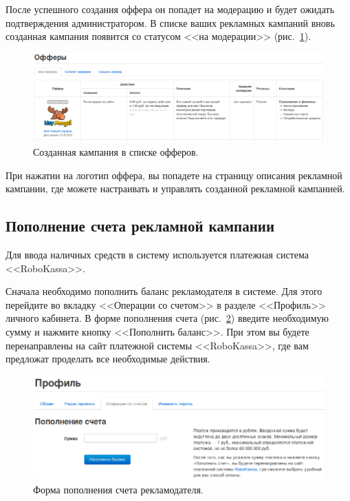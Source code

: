 \documentclass[a4paper,12pt]{article}
\begin{document}
После успешного создания оффера он попадет на модерацию и будет ожидать подтверждения администратором. В списке ваших рекламных кампаний вновь созданная кампания появится со статусом <<на модерации>> (рис.~\ref{fig:offer}).

\begin{figure}[!ht]
\centering
\includegraphics[width=\textwidth]{include/offer.png}
\caption{Созданная кампания в списке офферов.}
\label{fig:offer}
\end{figure}

При нажатии на логотип оффера, вы попадете на страницу описания рекламной кампании, где можете настраивать и управлять созданной рекламной кампанией.

\subsection{Пополнение счета рекламной кампании}

Для ввода наличных средств в систему \heymoose{} используется платежная система <<RoboKassa>>.

Сначала необходимо пополнить баланс рекламодателя в системе. Для этого перейдите во вкладку <<Операции со счетом>> в разделе <<Профиль>> личного кабинета. В форме пополнения счета (рис.~\ref{fig:operations}) введите необходимую сумму и нажмите кнопку <<Пополнить баланс>>. При этом вы будете перенаправлены на сайт платежной системы <<RoboKassa>>, где вам предложат проделать все необходимые действия.

\begin{figure}[!ht]
\centering
\includegraphics[width=\textwidth]{include/operations.png}
\caption{Форма пополнения счета рекламодателя.}
\label{fig:operations}
\end{figure}
\end{document}
